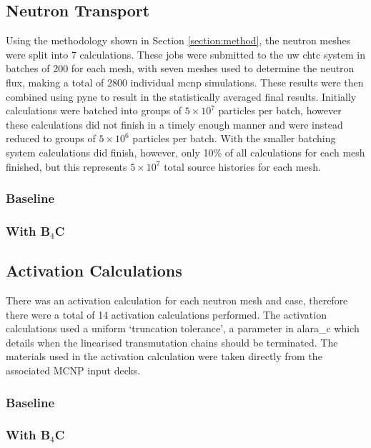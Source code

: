 \documentclass[12pt]{article}
\begin{document}
\subsection{Neutron Transport}
Using the methodology shown in Section \ref{section:method}, the neutron meshes
were split into 7 calculations. These jobs were submitted to the \gls{uw}
\gls{chtc} system in batches of 200 for each mesh, with seven meshes used to
determine the neutron flux, making a
total of 2800 individual \gls{mcnp} simulations. These results were then
combined using \gls{pyne} to result in the statistically averaged final results.
Initially calculations were batched into groups of $5\times10^7$ particles per
batch, however these calculations did not finish in a timely enough manner and
were instead reduced to groups of $5\times10^6$ particles per batch. With the
smaller batching system calculations did finish, however, only 10\% of all
calculations for each mesh finished, but this represents $5\times10^7$ total
source histories for each mesh.
\subsubsection{Baseline}
\subsubsection{With B$_4$C}
\subsection{Activation Calculations}
There was an activation calculation for each neutron mesh and case, therefore
there were a total of 14 activation calculations performed. The activation
calculations used a uniform `truncation tolerance', a parameter in \gls{alara_c}
which details when the linearised transmutation chains should be terminated. The
materials used in the activation calculation were taken directly from the 
associated MCNP input decks.
\subsubsection{Baseline}
\subsubsection{With B$_4$C}
\end{document}
